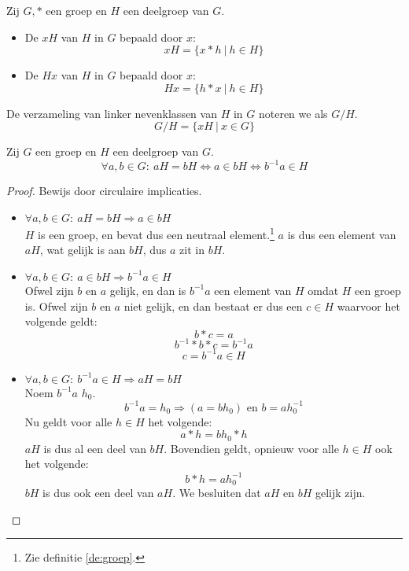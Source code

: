 \documentclass[main.tex]{subfiles}
\begin{document}
\begin{de}
  \label{de:nevenklassen}
  Zij $G,*$ een groep en $H$ een deelgroep van $G$.
  \begin{itemize}
  \item De  $xH$ van $H$ in $G$ bepaald door $x$:
    \[ xH = \{ x * h\ |\ h \in H \} \]
  \item De  $Hx$ van $H$ in $G$ bepaald door $x$:
    \[ Hx = \{ h * x\ |\ h \in H \} \]
  \end{itemize}
  De verzameling van linker nevenklassen van $H$ in $G$ noteren we als $G/H$.
  \[ G/H = \{ xH\ |\ x \in G \} \]
\end{de}

\begin{ei}
  \label{ei:linker-nevenklasse-eig}
  Zij $G$ een groep en $H$ een deelgroep van $G$.
  \[ \forall a,b \in G:\ aH = bH \Leftrightarrow a \in bH \Leftrightarrow b^{-1}a \in H \]

  \begin{proof}
    Bewijs door circulaire implicaties.
    \begin{itemize}
    \item $\forall a,b \in G:\ aH = bH \Rightarrow a \in bH$\\
      $H$ is een groep, en bevat dus een neutraal element.\footnote{Zie definitie \ref{de:groep}.}
      $a$ is dus een element van $aH$, wat gelijk is aan $bH$, dus $a$ zit in $bH$.
    \item $\forall a,b \in G:\ a \in bH \Rightarrow b^{-1}a \in H$\\
      Ofwel zijn $b$ en $a$ gelijk, en dan is $b^{-1}a$ een element van $H$ omdat $H$ een groep is.
      Ofwel zijn $b$ en $a$ niet gelijk, en dan bestaat er dus een $c \in H$ waarvoor het volgende geldt:
      \[ b*c = a\]
      \[ b^{-1}*b*c = b^{-1}a\]
      \[ c = b^{-1}a \in H \]
    \item $\forall a,b \in G:\ b^{-1}a \in H\Rightarrow aH = bH$\\
      Noem $b^{-1}a$ $h_{0}$.
      \[ b^{-1}a = h_{0} \Rightarrow (a = bh_{0}) \text { en } b = a h_{0}^{-1} \]
      Nu geldt voor alle $h \in H$ het volgende:
      \[ a * h = bh_{0}*h \]
      $aH$ is dus al een deel van $bH$.
      Bovendien geldt, opnieuw voor alle $h \in H$ ook het volgende:
      \[ b * h = ah_{0}^{-1} \]
      $bH$ is dus ook een deel van $aH$.
      We besluiten dat $aH$ en $bH$ gelijk zijn.
   \end{itemize}
  \end{proof}
\end{ei}
\end{document}
